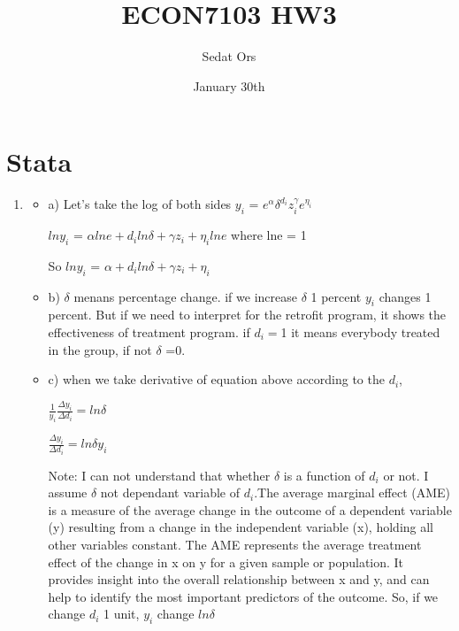 \documentclass{article}
\title{ECON7103 HW3}
\author{Sedat Ors}
\date{January 30th}
\begin{document}
\maketitle

\section{Stata}

\begin{enumerate}
\item

\begin{itemize}
\item a)
\vspace{0.5cm}
Let's take the log of both sides  $y_i$ = $e^{\alpha}{\delta^{d_i}}{z_i^{\gamma}}{e^{\eta_i}}$ 

$ln{y_i}$ = ${\alpha}{lne} +{d_i}{ln\delta} + {\gamma}{z_i} +{\eta_i}{lne}$ where lne = 1

So $ln{y_i}$ = ${\alpha} +{d_i}{ln\delta} + {\gamma}{z_i} +{\eta_i}$
\vspace{0.5cm}
\item b)
$\delta$ menans percentage change. if we increase $\delta$ 1 percent ${y_i}$ changes 1 percent. 
But if we need to interpret for the retrofit program, it shows the effectiveness of treatment program. if ${d_i} = $1 
it means everybody treated in the group, if not $\delta$ =0. 
\vspace{0.5cm}
\item c)
when we take derivative of equation above according to the ${d_i}$,

${\frac{1}{y_i}}{\frac{\Delta{y_i}}{\Delta{d_i}}} = ln\delta$

${\frac{\Delta{y_i}} {\Delta{d_i}}}=  l{n\delta}{y_i}$
\vspace{0.5cm}

Note: I can not understand that whether ${\delta}$ is a function of ${d_i}$ or not. I assume ${\delta}$ not dependant variable of ${d_i}$.The average marginal effect (AME) is a measure of the average change in the outcome of a dependent variable (y) resulting from a change in the independent variable (x), holding all other variables constant. The AME represents the average treatment effect of the change in x on y for a given sample or population. It provides insight into the overall relationship between x and y, and can help to identify the most important predictors of the outcome. So, if we change ${d_i}$ 1 unit, ${y_i}$ change $ln\delta$


\end{itemize}
\end{enumerate}
\end{document}
